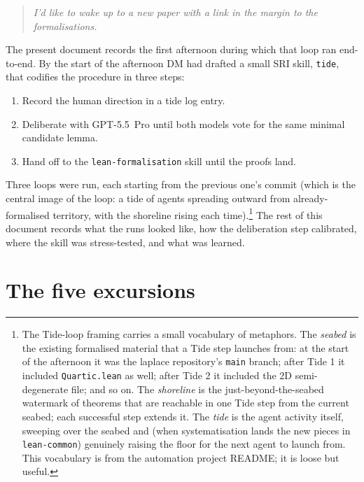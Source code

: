 \documentclass[11pt]{article}
\begin{document}
\begin{quote}
\itshape
I'd like to wake up to a new paper with a link in the margin to the
formalisations.
\end{quote}

The present document records the first afternoon during which that loop
ran end-to-end. By the start of the afternoon DM had drafted a small
SRI skill, \texttt{tide}, that codifies the procedure in three steps:

\begin{enumerate}
\item Record the human direction in a tide log entry.
\item Deliberate with GPT-5.5~Pro until both models vote for the same
minimal candidate lemma.
\item Hand off to the \texttt{lean-formalisation} skill until the
proofs land.
\end{enumerate}

Three loops were run, each starting from the previous one's commit
(which is the central image of the loop: a tide of agents spreading
outward from already-formalised territory, with the shoreline rising
each time).\footnote{The Tide-loop framing carries a small vocabulary
of metaphors. The \emph{seabed} is the existing formalised material
that a Tide step launches from: at the start of the afternoon it was
the laplace repository's \texttt{main} branch; after Tide 1 it
included \texttt{Quartic.lean} as well; after Tide 2 it included the
2D semi-degenerate file; and so on. The \emph{shoreline} is the
just-beyond-the-seabed watermark of theorems that are reachable in
one Tide step from the current seabed; each successful step extends
it. The \emph{tide} is the agent activity itself, sweeping over the
seabed and (when systematisation lands the new pieces in
\texttt{lean-common}) genuinely raising the floor for the next
agent to launch from. This vocabulary is from the automation project
README; it is loose but useful.}
The rest of this document records what the runs looked
like, how the deliberation step calibrated, where the skill was
stress-tested, and what was learned.

\section{The five excursions}\label{sec:excursions}
\end{document}
